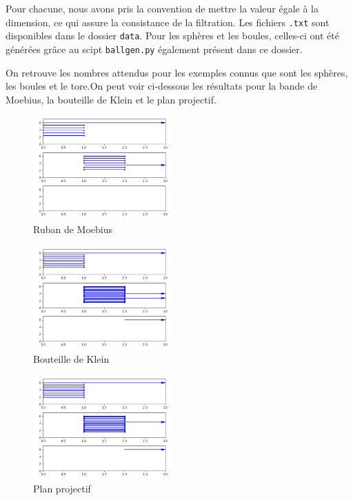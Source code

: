 \documentclass[french, a4paper, 12pt]{article}
\begin{document}
Pour chacune, nous avons pris la convention de mettre la valeur 
égale à la dimension, ce qui assure la consistance de la filtration. 
Les fichiers \texttt{.txt} sont disponibles dans le dossier 
\texttt{data}. Pour les sphères et les boules, celles-ci ont été 
générées grâce au scipt \texttt{ballgen.py} également présent dans
ce dossier.

\vskip 0.5cm

On retrouve les nombres attendus pour les exemples connus que sont 
les sphères, les boules et le tore.On peut voir ci-dessous les
résultats pour la bande de Moebius, la bouteille de Klein et le
plan projectif.

\pagebreak

\begin{figure}[h!]
    \caption{Ruban de Moebius}
    \centering
    \includegraphics[height=150px]{moebius.png}
\end{figure}

\begin{figure}[h!]
    \caption{Bouteille de Klein}
    \centering
    \includegraphics[height=150px]{klein.png}
\end{figure}

\begin{figure}[h!]
    \caption{Plan projectif}
    \centering
    \includegraphics[height=150px]{projective.png}
\end{figure}
\end{document}
